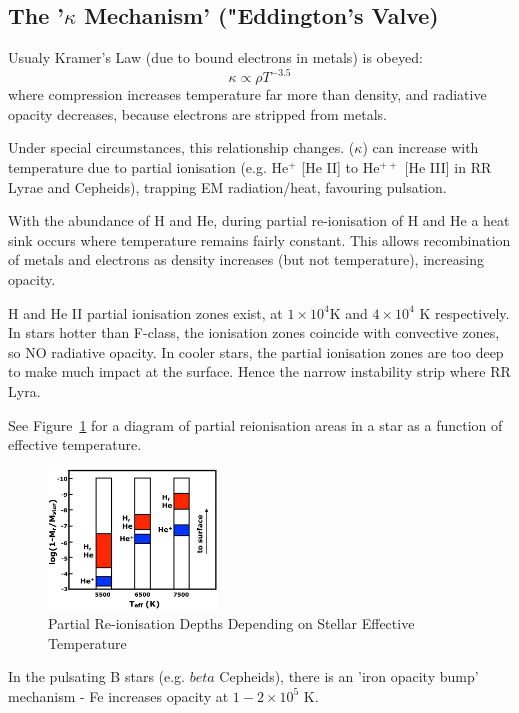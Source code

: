 \documentclass{spy}
\begin{document}
\subsection{The '\(\kappa\) Mechanism' ("Eddington's Valve)}
Usualy Kramer's Law (due to bound electrons in metals) is obeyed:
\begin{equation}
    \kappa \propto \rho T^{-3.5}
\end{equation}
where compression increases temperature far more than density, and radiative opacity decreases, because electrons are stripped from metals. 

Under special circumstances, this relationship changes. (\(\kappa\)) can increase with temperature due to partial ionisation (e.g. He\(^+\) [He II] to He\(^{++}\) [He III] in RR Lyrae and Cepheids), trapping EM radiation/heat, favouring pulsation.  

With the abundance of H and He, during partial re-ionisation of H and He a heat sink occurs where temperature remains fairly constant. This allows recombination of metals and electrons as density increases (but not temperature), increasing opacity. 

H and He II partial ionisation zones exist, at \(1 \times 10^4\)K and \(4 \times 10^4\) K respectively. In stars hotter than F-class, the ionisation zones coincide with convective zones, so NO radiative opacity. In cooler stars, the partial ionisation zones are too deep to make much impact at the surface. Hence the narrow instability strip where RR Lyra.

See Figure~\ref{ionisation_temp_diagram} for a diagram of partial reionisation areas in a star as a function of effective temperature. 

\begin{figure}[h]
    \centering
    \includegraphics[width=0.4\textwidth]{ionisation_temp.eps}
    \caption{Partial Re-ionisation Depths Depending on Stellar Effective Temperature} 
    \label{ionisation_temp_diagram}
\end{figure}

In the pulsating B stars (e.g. \(beta\) Cepheids), there is an 'iron opacity bump' mechanism - Fe increases opacity at \(1-2 \times 10^5\) K. 
\end{document}
